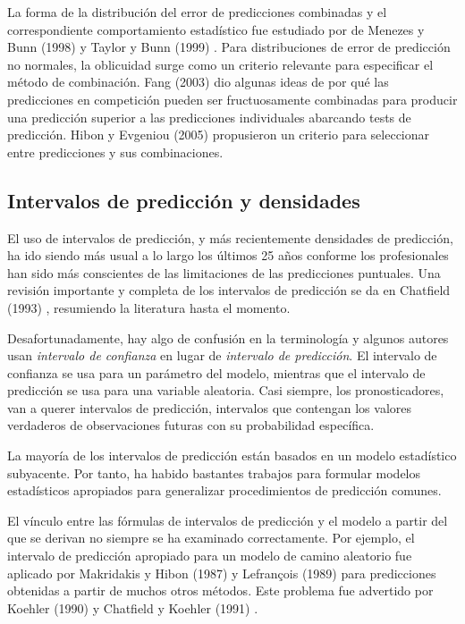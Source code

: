 \documentclass{llncs}
\begin{document}
La forma de la distribución del error de predicciones combinadas y el correspondiente comportamiento estadístico fue estudiado por de Menezes y Bunn (1998) \cite{DeMenezes1998415} y Taylor y Bunn (1999) \cite{Taylor1999325}. Para distribuciones de error de predicción  no normales, la oblicuidad surge como un criterio relevante para especificar el método de combinación. Fang (2003) \cite{Fang200387} dio algunas ideas de por qué las predicciones en competición pueden ser fructuosamente combinadas para producir una predicción superior a las predicciones individuales abarcando tests de predicción. Hibon y Evgeniou (2005) \cite{Hibon200515} propusieron un criterio para seleccionar entre predicciones y sus combinaciones.

\subsection{Intervalos de predicción y densidades}
El uso de intervalos de predicción, y más recientemente densidades de predicción, ha ido siendo más usual a lo largo los últimos 25 años conforme los profesionales han sido más conscientes de las limitaciones de las predicciones puntuales. Una revisión importante y completa de los intervalos de predicción se da en Chatfield (1993) \cite{Chatfield1993121}, resumiendo la literatura hasta el momento.

Desafortunadamente, hay algo de confusión en la terminología y algunos autores usan \emph{intervalo de confianza} en lugar de \emph{intervalo de predicción}. El intervalo de confianza se usa para un parámetro del modelo, mientras que el intervalo de predicción se usa para una variable aleatoria. Casi siempre, los pronosticadores, van a querer intervalos de predicción, intervalos que contengan los valores verdaderos de observaciones futuras con su probabilidad específica.

La mayoría de los intervalos de predicción están basados en un modelo estadístico subyacente. Por tanto, ha habido bastantes trabajos para formular modelos estadísticos apropiados para generalizar procedimientos de predicción comunes.

El vínculo entre las fórmulas de intervalos de predicción y el modelo a partir del que se derivan no siempre se ha examinado correctamente. Por ejemplo, el intervalo de predicción apropiado para un modelo de camino aleatorio fue aplicado por Makridakis y Hibon (1987) \cite{Makridakis1987489} y Lefrançois (1989) \cite{Lefrancois1989553} para predicciones obtenidas a partir de muchos otros métodos. Este problema fue advertido por Koehler (1990) \cite{Koehler1990557} y Chatfield y Koehler (1991) \cite{Chatfield1991239}.
\end{document}
